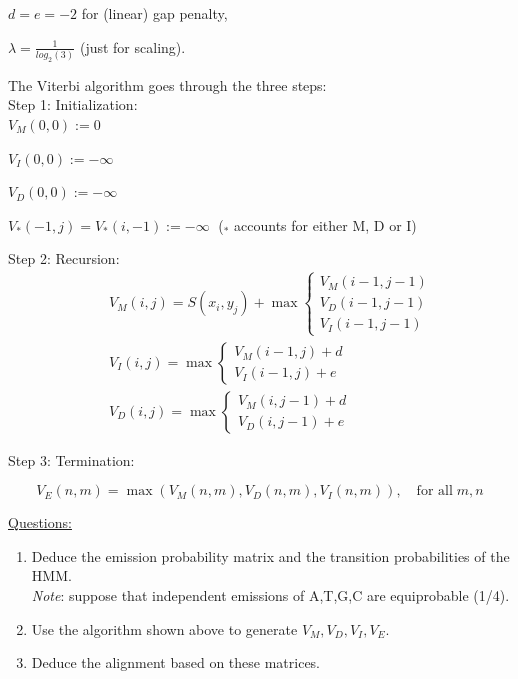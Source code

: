 \documentclass[a4paper,11pt]{article}
\begin{document}
$d = e = -2$ for (linear) gap penalty,

$\lambda = \frac{1}{log_2(3)}$ (just for scaling).

\newpage
The Viterbi algorithm goes through the three steps:\\


Step 1: Initialization:\\

$V_M(0,0):=0$

$V_I(0,0):=-\infty$

$V_D(0,0):=-\infty$

$V_*(-1,j)=V_*(i,-1):=-\infty \;$ ($_*$ accounts for either M, D or I)
\vspace{0.5cm}

Step 2: Recursion:
\begin{eqnarray}
&&
V_M(i,j) =S(x_{i},y_{j})+\max 
	\left\{ \begin{array}{l}
	 V_M(i-1,j-1) \\
     V_D(i-1,j-1) \\
     V_I(i-1,j-1)
    \end{array} \right.\nonumber\\
&&
V_I(i,j) =\max \left\{ 
    \begin{array}{ll}
     V_M(i-1,j)+d \\
     V_I(i-1,j)+e 
    \end{array} \right.\nonumber\\
&&
V_D(i,j) =\max \left\{ 
    \begin{array}{ll}
     V_M(i,j-1)+d\\
     V_D(i,j-1)+e
    \end{array} \right.\nonumber
\end{eqnarray}


Step 3: Termination:

$$V_E(n,m)=\max(V_M(n,m),V_D(n,m),V_I(n,m)), \quad \text{for all} \;  m,n$$

\underline{Questions:}
\begin{enumerate}
\item Deduce the emission probability matrix and the transition probabilities of the HMM.\\
	\textit{Note}: suppose that independent emissions of A,T,G,C are equiprobable (1/4).
\item Use the algorithm shown above to generate $V_M, V_D, V_I, V_E$.
\item Deduce the alignment based on these matrices.
\end{enumerate}
\end{document}
